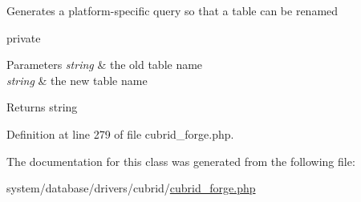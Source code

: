 Generates a platform-\/specific query so that a table can be renamed

private 
\begin{DoxyParams}{Parameters}
{\em string} & the old table name \\
\hline
{\em string} & the new table name \\
\hline
\end{DoxyParams}
\begin{DoxyReturn}{Returns}
string 
\end{DoxyReturn}


Definition at line 279 of file cubrid\-\_\-forge.\-php.



The documentation for this class was generated from the following file\-:\begin{DoxyCompactItemize}
\item 
system/database/drivers/cubrid/\hyperlink{cubrid__forge_8php}{cubrid\-\_\-forge.\-php}\end{DoxyCompactItemize}
